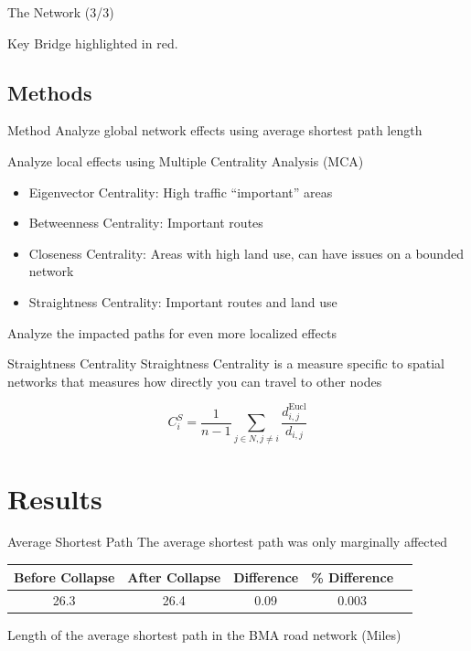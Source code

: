 \documentclass{beamer}
\numberwithin{figure}{section} %
\numberwithin{table}{section} %
\begin{document}
\begin{frame}{The Network (3/3)}
    \begin{center}
    {\footnotesize Key Bridge highlighted in red.}
    \end{center}
\end{frame}

\subsection{Methods}

\begin{frame}{Method}
    Analyze global network effects using average shortest path length {\tiny \parencites{Xeumei10}{Kaub24}}

    Analyze local effects using Multiple Centrality Analysis (MCA) {\tiny \parencites{Porta06}{Porta07}{Barthelemy09}{Jayaweera17}}
    \begin{itemize}
        \item Eigenvector Centrality: High traffic ``important'' areas
        \item Betweenness Centrality: Important routes
        \item Closeness Centrality: Areas with high land use, can have issues on a bounded network
        \item Straightness Centrality: Important routes and land use
    \end{itemize}

   Analyze the impacted paths for even more localized effects
\end{frame}

\begin{frame}{Straightness Centrality}
    Straightness Centrality is a measure specific to spatial networks that measures how directly you can travel to other nodes

    \begin{equation*}
        C_i^S = \frac{1}{n-1} \sum_{j \in N, j \neq i} \frac{d_{i, j}^\text{Eucl}}{d_{i, j}}
    \end{equation*}
\end{frame}


\section{Results}

\begin{frame}{Average Shortest Path}
    The average shortest path was only marginally affected
    
    \begin{table}
        \centering
        \begin{tabular}{ccccc}
            \toprule
            \textbf{Before Collapse} & \textbf{After Collapse} & \textbf{Difference} & \textbf{\% Difference} \\
            \midrule
            26.3 & 26.4 & 0.09 & 0.003 \\
            \bottomrule
        \end{tabular}
        {\scriptsize Length of the average shortest path in the BMA road network (Miles)}
    \end{table}
\end{frame}
\end{document}
